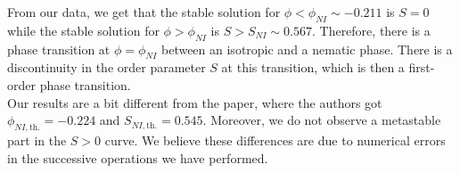 \documentclass[class=article, float=false, crop=false]{standalone}
\begin{document}
From our data, we get that the stable solution for $\phi < \phi_{NI} \sim -0.211$ is $S=0$ while the stable solution for $\phi > \phi_{NI}$ is $S > S_{NI} \sim 0.567$. Therefore, there is a phase transition at $\phi=\phi_{NI}$ between an isotropic and a nematic phase. There is a discontinuity in the order parameter $S$ at this transition, which is then a first-order phase transition.\\

Our results are a bit different from the paper, where the authors got $\phi_{NI,\text{th.}} = -0.224$ and $S_{NI,\text{th.}} = 0.545$. Moreover, we do not observe a metastable part in the $S>0$ curve. We believe these differences are due to numerical errors in the successive operations we have performed.

% 
\end{document}
